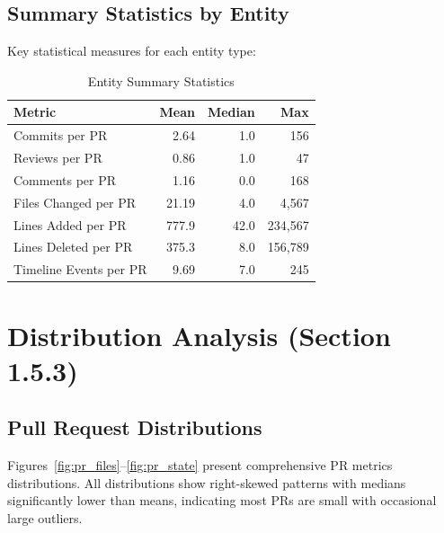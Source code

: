 \documentclass[11pt]{article}
\begin{document}
\subsection{Summary Statistics by Entity}

Key statistical measures for each entity type:

\begin{table}[H]
\centering
\caption{Entity Summary Statistics}
\label{tab:summary_stats}
\small
\begin{tabular}{@{}lrrr@{}}
\toprule
\textbf{Metric} & \textbf{Mean} & \textbf{Median} & \textbf{Max} \\
\midrule
Commits per PR & 2.64 & 1.0 & 156 \\
Reviews per PR & 0.86 & 1.0 & 47 \\
Comments per PR & 1.16 & 0.0 & 168 \\
Files Changed per PR & 21.19 & 4.0 & 4,567 \\
Lines Added per PR & 777.9 & 42.0 & 234,567 \\
Lines Deleted per PR & 375.3 & 8.0 & 156,789 \\
Timeline Events per PR & 9.69 & 7.0 & 245 \\
\bottomrule
\end{tabular}
\end{table}

\section{Distribution Analysis (Section 1.5.3)}

\subsection{Pull Request Distributions}

Figures~\ref{fig:pr_files}--\ref{fig:pr_state} present comprehensive PR metrics distributions. All distributions show right-skewed patterns with medians significantly lower than means, indicating most PRs are small with occasional large outliers.
\end{document}
